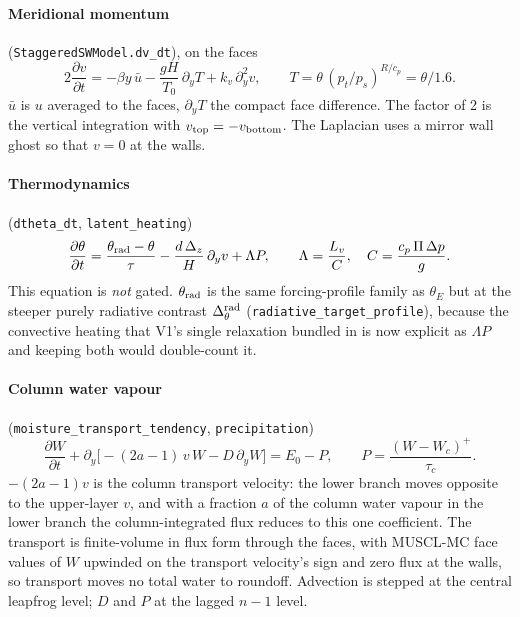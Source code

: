 \documentclass[11pt]{article}
\newcommand{\py}{\partial_y}
\newcommand{\dyr}{\Delta_\theta^{\rm rad}}
\begin{document}
\paragraph{Meridional momentum} (\texttt{StaggeredSWModel.dv\_dt}), on the faces
\begin{equation}
2\frac{\partial v}{\partial t}
= -\beta y\,\bar{u}
- \frac{gH}{T_0}\,\py T
+ k_v\,\py^2 v ,
\qquad T = \theta\,(p_t/p_s)^{R/c_p} = \theta/1.6 .
\label{eq:v}
\end{equation}
$\bar u$ is $u$ averaged to the faces, $\py T$ the compact face difference. The
factor of 2 is the vertical integration with $v_{\rm top} = -v_{\rm bottom}$.
The Laplacian uses a mirror wall ghost so that $v = 0$ at the walls.

\paragraph{Thermodynamics} (\texttt{dtheta\_dt}, \texttt{latent\_heating})
\begin{equation}
\frac{\partial \theta}{\partial t}
= \frac{\theta_{\rm rad} - \theta}{\tau}
- \frac{d\,\Delta_z}{H}\,\py v
+ \Lambda P ,
\qquad
\Lambda = \frac{L_v}{C},
\quad
C = \frac{c_p\,\Pi\,\Delta p}{g} .
\label{eq:theta}
\end{equation}
This equation is \emph{not} gated. $\theta_{\rm rad}$ is the same forcing-profile
family as $\theta_E$ but at the steeper purely radiative contrast $\dyr$
(\texttt{radiative\_target\_profile}), because the convective heating that V1's
single relaxation bundled in is now explicit as $\Lambda P$ and keeping both
would double-count it.

\paragraph{Column water vapour} (\texttt{moisture\_transport\_tendency},
\texttt{precipitation})
\begin{equation}
\frac{\partial W}{\partial t}
+ \py\Big[-(2a-1)\,v\,W - D\,\py W\Big]
= E_0 - P ,
\qquad
P = \frac{(W - W_c)^{+}}{\tau_c} .
\label{eq:w}
\end{equation}
$-(2a-1)v$ is the column transport velocity: the lower branch moves opposite to
the upper-layer $v$, and with a fraction $a$ of the column water vapour in the
lower branch the column-integrated flux reduces to this one coefficient. The
transport is finite-volume in flux form through the faces, with MUSCL-MC face
values of $W$ upwinded on the transport velocity's sign and zero flux at the
walls, so transport moves no total water to roundoff. Advection is stepped at
the central leapfrog level; $D$ and $P$ at the lagged $n-1$ level.
\end{document}
